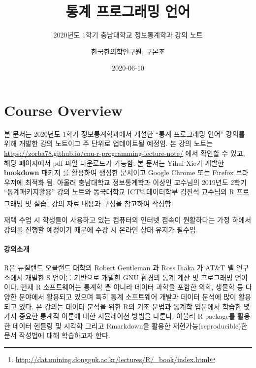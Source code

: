 \documentclass[
  11pt,
]{krantz}
\title{통계 프로그래밍 언어}
\subtitle{2020년도 1학기 충남대학교 정보통계학과 강의 노트}
\author{한국한의학연구원, 구본초}
\date{2020-06-10}
\makeatletter
\renewcommand{\href}[2]{#2\footnote{\url{#1}}}
\newenvironment{kframe}{%
\medskip{}
\setlength{\fboxsep}{.8em}
 \def\at@end@of@kframe{}%
 \ifinner\ifhmode%
  \def\at@end@of@kframe{\end{minipage}}%
  \begin{minipage}{\columnwidth}%
 \fi\fi%
 \def\FrameCommand##1{\hskip\@totalleftmargin \hskip-\fboxsep
 \colorbox{shadecolor}{##1}\hskip-\fboxsep
     \hskip-\linewidth \hskip-\@totalleftmargin \hskip\columnwidth}%
 \MakeFramed {\advance\hsize-\width
   \@totalleftmargin\z@ \linewidth\hsize
   \@setminipage}}%
 {\par\unskip\endMakeFramed%
 \at@end@of@kframe}
\newenvironment{rmdblock}[1]
  {
  \begin{itemize}
  \renewcommand{\labelitemi}{
    \raisebox{-.7\height}[0pt][0pt]{
      {\setkeys{Gin}{width=3em,keepaspectratio}\texttt{[image: images/\#1]}}
    }
  }
  \setlength{\fboxsep}{1em}
  \begin{kframe}
  \item
  }
  {
  \end{kframe}
  \end{itemize}
  }
\newenvironment{rmdnote}
  {\begin{rmdblock}{note}}
  {\end{rmdblock}}
\makeatother
\begin{document}
\maketitle

{
\hypersetup{linkcolor=}
\setcounter{tocdepth}{2}
\tableofcontents
}
\listoftables
\listoffigures
\hypertarget{overview}{%
\chapter*{Course Overview}\label{overview}}


\begin{rmdnote}
\begin{rmdnote}

본 문서는 2020년도 1학기 정보통계학과에서 개설한 ``통계 프로그래밍 언어'' 강의를 위해 개발한 강의 노트이고 주 단위로 업데이트될 예정임. 본 강의 노트는 \url{https://zorba78.github.io/cnu-r-programming-lecture-note/} 에서 확인할 수 있고, 해당 페이지에서 pdf 파일 다운로드가 가능함. 본 문서는 Yihui Xie가 개발한 \textbf{bookdown} 패키지 \citep{xie-2016}를 활용하여 생성한 문서이고 Google Chrome 또는 Firefox 브라우저에 최적화 됨. 아울러 충남대학교 정보통계학과 이상인 교수님의 2019년도 2학기 ``통계패키지활용'' 강의 노트와 동국대학교 ICT빅데이터학부 김진석 교수님의 \href{http://datamining.dongguk.ac.kr/lectures/R/_book/index.html}{R 프로그래밍 및 실습} 강의 자료 내용과 구성을 참고하여 작성함.

재택 수업 시 학생들이 사용하고 있는 컴퓨터의 인터넷 접속이 원활하다는 가정 하에서 강의를 진행할 예정이기 때문에 수강 시 온라인 상태 유지가 필수임.

\end{rmdnote}
\end{rmdnote}

\hypertarget{intro-lec}{%
\subsubsection*{강의소개}\label{intro-lec}}


R은 뉴질랜드 오클랜드 대학의 Robert Gentleman 과 Ross Ihaka 가 AT\&T 벨 연구소에서 개발한 S 언어를 기반으로 개발한 GNU 환경의 통계 계산 및 프로그래밍 언어이다. 현재 R 소프트웨어는 통계학 뿐 아니라 데이터 과학을 포함한 의학, 생물학 등 다양한 분야에서 활용되고 있으며 특히 통계 소프트웨어 개발과 데이터 분석에 많이 활용되고 있다. 본 강의는 데이터 분석을 위한 R의 기초 문법과 통계학 입문에서 학습한 몇 가지 중요한 통계적 이론에 대한 시뮬레이션 방법을 다룬다. 아울러 R package를 활용한 데이터 헨들링 및 시각화 그리고 Rmarkdown을 활용한 재현가능(reproducible)한 문서 작성법에 대해 학습하고자 한다.
\end{document}
